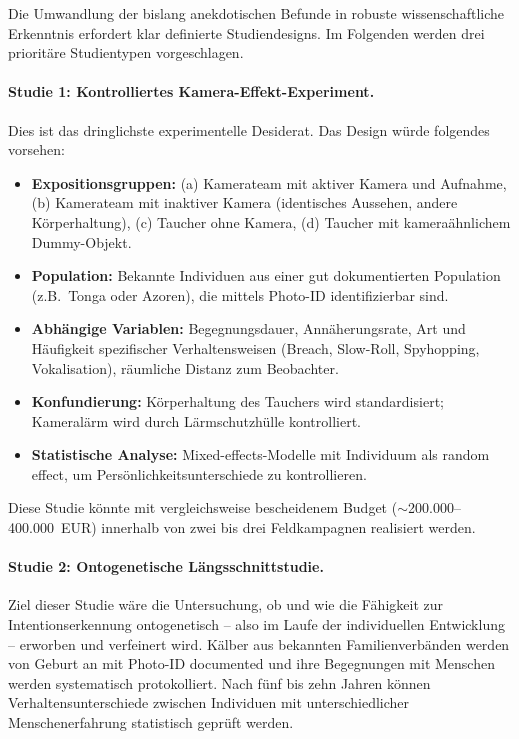 ﻿\documentclass[12pt,a4paper]{article}
\theoremstyle{definition}
\theoremstyle{remark}
\begin{document}
Die Umwandlung der bislang anekdotischen Befunde in robuste wissenschaftliche Erkenntnis erfordert klar definierte Studiendesigns. Im Folgenden werden drei prioritäre Studientypen vorgeschlagen.

\paragraph{Studie 1: Kontrolliertes Kamera-Effekt-Experiment.}
Dies ist das dringlichste experimentelle Desiderat. Das Design würde folgendes vorsehen:

\begin{itemize}
  \item \textbf{Expositionsgruppen:} (a) Kamerateam mit aktiver Kamera und Aufnahme,
        (b) Kamerateam mit inaktiver Kamera (identisches Aussehen, andere Körperhaltung),
        (c) Taucher ohne Kamera, (d) Taucher mit kameraähnlichem Dummy-Objekt.
  \item \textbf{Population:} Bekannte Individuen aus einer gut dokumentierten
        Population (z.B.\ Tonga oder Azoren), die mittels Photo-ID identifizierbar sind.
  \item \textbf{Abhängige Variablen:} Begegnungsdauer, Annäherungsrate, Art und
        Häufigkeit spezifischer Verhaltensweisen (Breach, Slow-Roll, Spyhopping,
        Vokalisation), räumliche Distanz zum Beobachter.
  \item \textbf{Konfundierung:} Körperhaltung des Tauchers wird standardisiert;
        Kameralärm wird durch Lärmschutzhülle kontrolliert.
  \item \textbf{Statistische Analyse:} Mixed-effects-Modelle mit Individuum als
        random effect, um Persönlichkeitsunterschiede zu kontrollieren.
\end{itemize}

Diese Studie könnte mit vergleichsweise bescheidenem Budget ($\sim$200.000--400.000~EUR) innerhalb von zwei bis drei Feldkampagnen realisiert werden.

\paragraph{Studie 2: Ontogenetische Längsschnittstudie.}
Ziel dieser Studie wäre die Untersuchung, ob und wie die Fähigkeit zur Intentionserkennung ontogenetisch -- also im Laufe der individuellen Entwicklung -- erworben und verfeinert wird. Kälber aus bekannten Familienverbänden werden von Geburt an mit Photo-ID documented und ihre Begegnungen mit Menschen werden systematisch protokolliert. Nach fünf bis zehn Jahren können Verhaltensunterschiede zwischen Individuen mit unterschiedlicher Menschenerfahrung statistisch geprüft werden.
\end{document}
